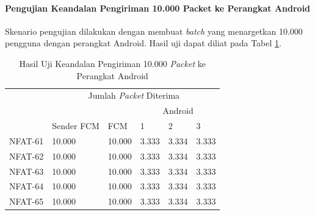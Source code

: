 \paragraph{Pengujian Keandalan Pengiriman 10.000 Packet ke Perangkat Android}
\par Skenario pengujian dilakukan dengan membuat \textit{batch} yang menargetkan 10.000 pengguna dengan perangkat Android. Hasil uji dapat diliat pada Tabel \ref{t:keandalan-android-10k}.
\begin{longtable}{|p{1.5cm}|p{2cm}|p{1.5cm}|p{1cm}|p{1cm}|p{1cm}|}
	\caption{Hasil Uji Keandalan Pengiriman 10.000 \textit{Packet} ke Perangkat Android} \label{t:keandalan-android-10k} \\ \hline
	\rowcolor{lightgray} & \multicolumn{5}{c|}{Jumlah \textit{Packet} Diterima} \\ \hhline{~|*5{-}|}
	\rowcolor{lightgray} & & & \multicolumn{3}{c|}{Android} \\ \hhline{~~~|*3{-}|}
	\rowcolor{lightgray} \multirow{-3}{*}{Kode} & \multirow{-2}{*}{Sender FCM} & \multirow{-2}{*}{FCM} & 1 & 2 & 3 \\ \hline
	\endhead
	NFAT-61 & 10.000 & 10.000 & 3.333 & 3.334 & 3.333 \\ \hline
	NFAT-62 & 10.000 & 10.000 & 3.333 & 3.334 & 3.333 \\ \hline
	NFAT-63 & 10.000 & 10.000 & 3.333 & 3.334 & 3.333 \\ \hline
	NFAT-64 & 10.000 & 10.000 & 3.333 & 3.334 & 3.333 \\ \hline
	NFAT-65 & 10.000 & 10.000 & 3.333 & 3.334 & 3.333 \\ \hline
\end{longtable}

